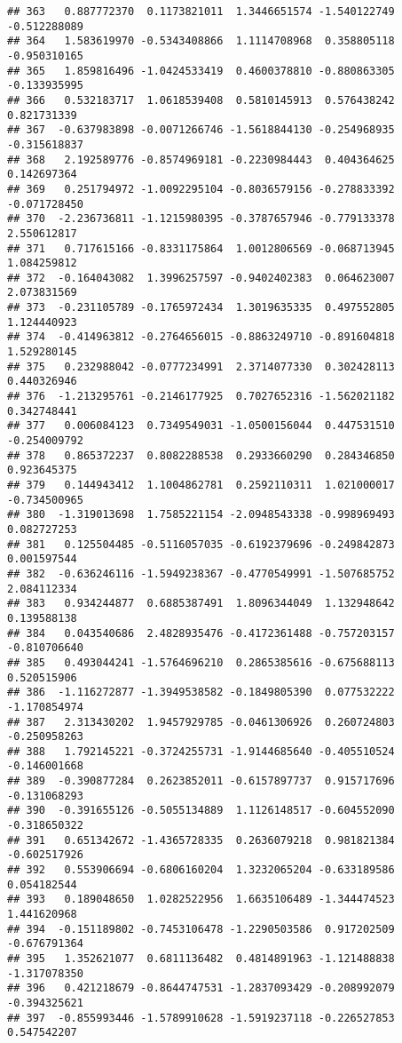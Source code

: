 \documentclass[
]{article}
\begin{document}
\begin{verbatim}
## 363   0.887772370  0.1173821011  1.3446651574 -1.540122749 -0.512288089
## 364   1.583619970 -0.5343408866  1.1114708968  0.358805118 -0.950310165
## 365   1.859816496 -1.0424533419  0.4600378810 -0.880863305 -0.133935995
## 366   0.532183717  1.0618539408  0.5810145913  0.576438242  0.821731339
## 367  -0.637983898 -0.0071266746 -1.5618844130 -0.254968935 -0.315618837
## 368   2.192589776 -0.8574969181 -0.2230984443  0.404364625  0.142697364
## 369   0.251794972 -1.0092295104 -0.8036579156 -0.278833392 -0.071728450
## 370  -2.236736811 -1.1215980395 -0.3787657946 -0.779133378  2.550612817
## 371   0.717615166 -0.8331175864  1.0012806569 -0.068713945  1.084259812
## 372  -0.164043082  1.3996257597 -0.9402402383  0.064623007  2.073831569
## 373  -0.231105789 -0.1765972434  1.3019635335  0.497552805  1.124440923
## 374  -0.414963812 -0.2764656015 -0.8863249710 -0.891604818  1.529280145
## 375   0.232988042 -0.0777234991  2.3714077330  0.302428113  0.440326946
## 376  -1.213295761 -0.2146177925  0.7027652316 -1.562021182  0.342748441
## 377   0.006084123  0.7349549031 -1.0500156044  0.447531510 -0.254009792
## 378   0.865372237  0.8082288538  0.2933660290  0.284346850  0.923645375
## 379   0.144943412  1.1004862781  0.2592110311  1.021000017 -0.734500965
## 380  -1.319013698  1.7585221154 -2.0948543338 -0.998969493  0.082727253
## 381   0.125504485 -0.5116057035 -0.6192379696 -0.249842873  0.001597544
## 382  -0.636246116 -1.5949238367 -0.4770549991 -1.507685752  2.084112334
## 383   0.934244877  0.6885387491  1.8096344049  1.132948642  0.139588138
## 384   0.043540686  2.4828935476 -0.4172361488 -0.757203157 -0.810706640
## 385   0.493044241 -1.5764696210  0.2865385616 -0.675688113  0.520515906
## 386  -1.116272877 -1.3949538582 -0.1849805390  0.077532222 -1.170854974
## 387   2.313430202  1.9457929785 -0.0461306926  0.260724803 -0.250958263
## 388   1.792145221 -0.3724255731 -1.9144685640 -0.405510524 -0.146001668
## 389  -0.390877284  0.2623852011 -0.6157897737  0.915717696 -0.131068293
## 390  -0.391655126 -0.5055134889  1.1126148517 -0.604552090 -0.318650322
## 391   0.651342672 -1.4365728335  0.2636079218  0.981821384 -0.602517926
## 392   0.553906694 -0.6806160204  1.3232065204 -0.633189586  0.054182544
## 393   0.189048650  1.0282522956  1.6635106489 -1.344474523  1.441620968
## 394  -0.151189802 -0.7453106478 -1.2290503586  0.917202509 -0.676791364
## 395   1.352621077  0.6811136482  0.4814891963 -1.121488838 -1.317078350
## 396   0.421218679 -0.8644747531 -1.2837093429 -0.208992079 -0.394325621
## 397  -0.855993446 -1.5789910628 -1.5919237118 -0.226527853  0.547542207

\end{verbatim}
\end{document}
